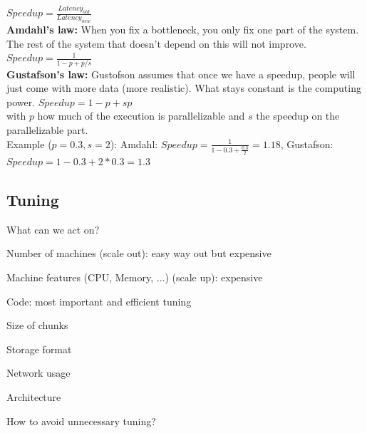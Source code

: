 \documentclass[11pt,oneside,a4paper]{article}
\begin{document}
{$Speedup = \frac{Latency_{old}}{Latency_{new}}$\\

\textbf{Amdahl's law:} When you fix a bottleneck, you only fix one part of the system. The rest of the system that doesn't depend on this will not improve. $Speedup = \frac{1}{1-p+p/s}$\\

\textbf{Gustafson's law:} Gustofson assumes that once we have a speedup, people will just come with more data (more realistic). What stays constant is the computing power. $Speedup = 1-p+sp$\\

with $p$ how much of the execution is parallelizable and $s$ the speedup on the parallelizable part.\\

Example ($p=0.3, s=2$): Amdahl: $Speedup = \frac{1}{1-0.3+\frac{0.3}{2}} = 1.18$, Gustafson: $Speedup = 1-0.3+2*0.3 = 1.3$


\subsection{Tuning}

What can we act on?

\begin{compactitem}
\item Number of machines (scale out): easy way out but expensive
\item Machine features (CPU, Memory, ...) (scale up): expensive
\item Code: most important and efficient tuning
\item Size of chunks
\item Storage format
\item Network usage
\item Architecture
\end{compactitem}

How to avoid unnecessary tuning?

}
\end{document}
